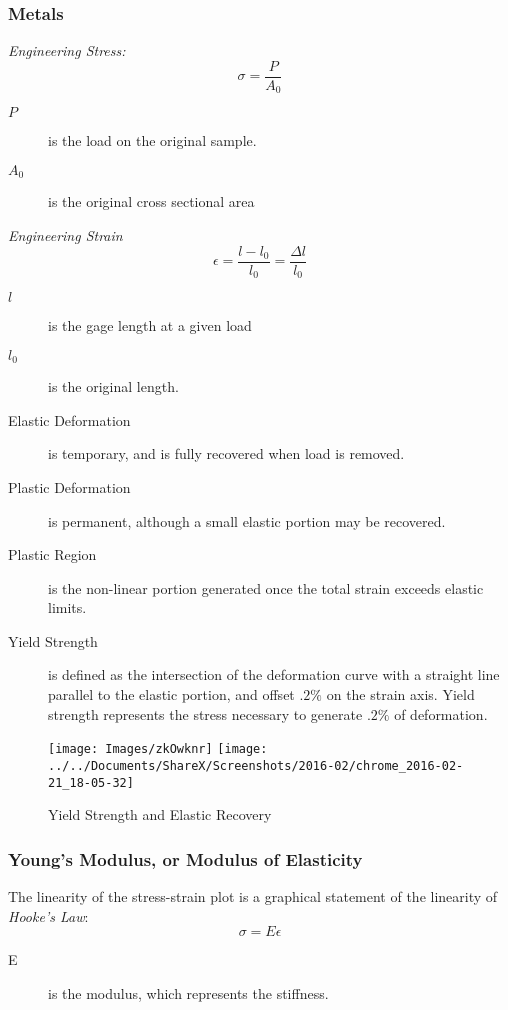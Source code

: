 \documentclass[10pt,letterpaper]{article}
\begin{document}
	\subsubsection*{Metals}
	\emph{Engineering Stress:}
	$$
	\sigma = \frac{P}{A_0}
	$$
	\begin{description}
		\item[$P$] is the load on the original sample.
		\item[$A_0$] is the original cross sectional area
	\end{description}
	
	\emph{Engineering Strain}
	$$
	\epsilon = \frac{l - l_0}{l_0} = \frac{\Delta l}{l_0}
	$$
	\begin{description}
		\item[$l$] is the gage length at a given load
		\item[$l_0$] is the original length. 
	\end{description}
	
	\begin{description}
		\item[Elastic Deformation] is temporary, and is fully recovered when load is removed.
		\item[Plastic Deformation] is permanent, although a small elastic portion may be recovered.
		\item[Plastic Region] is the non-linear portion generated once the total strain exceeds elastic limits.  
		\item[Yield Strength] is defined as the intersection of the deformation curve with a straight line parallel to the elastic portion, and offset $.2\%$ on the strain axis. Yield strength represents the stress necessary to generate $.2\%$ of deformation.
	\end{description}
	\begin{figure}
\centering
		\texttt{[image: Images/zkOwknr]}
		\label{fig:zkOwknr}
\texttt{[image: ../../Documents/ShareX/Screenshots/2016-02/chrome\_2016-02-21\_18-05-32]}
 \caption{Yield Strength and Elastic Recovery}
\label{fig:chrome_2016-02-21_18-05-32}
\end{figure}


	\subsubsection*{Young's Modulus, or Modulus of Elasticity}
	The linearity of the stress-strain plot is a graphical statement of the linearity of \textit{Hooke's Law}:
	$$
	\sigma = E \epsilon
	$$
	\begin{description}
		\item[E] is the modulus, which represents the stiffness. 
	\end{description}
	
\end{document}
